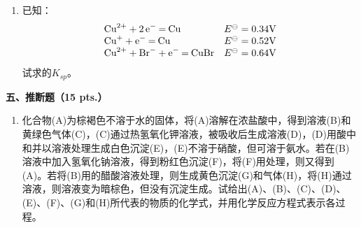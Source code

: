 \begin{enumerate}[label=\arabic*., start=1, itemsep=1.5ex]
    已知相关电对的电极电势值为：$E^\ominus(\ce{MnO(OH)2/Mn(OH)2}) = -0.05\mathrm{V}$；$E^\ominus(\ce{MnO2/Mn^{2+}}) = 1.23\mathrm{V}$；$E^\ominus(\ce{O2/OH^-}) = 0.401\mathrm{V}$；$E^\ominus(\ce{I2/I^-}) = 0.536\mathrm{V}$；$E^\ominus(\ce{S4O6^{2-}/S2O3^{2-}}) = 0.08\mathrm{V}$。
    \item 已知：
    \[
    \begin{array}{ll}
    \ce{Cu^{2+} + 2e^- = Cu} & E^\ominus = 0.34\mathrm{V} \\
    \ce{Cu^+ + e^- = Cu} & E^\ominus = 0.52\mathrm{V} \\
    \ce{Cu^{2+} + Br^- + e^- = CuBr} & E^\ominus = 0.64\mathrm{V}
    \end{array}
    \]
    试求的$K_{sp}$。
\end{enumerate}

\vspace{0.5cm}
\noindent\textbf{五、推断题（15 pts.）}

\begin{enumerate}[label=\arabic*., start=1, itemsep=1.5ex]
    \item 化合物(A)为棕褐色不溶于水的固体，将(A)溶解在浓盐酸中，得到溶液(B)和黄绿色气体(C)，(C)通过热氢氧化钾溶液，被吸收后生成溶液(D)，(D)用酸中和并以溶液处理生成白色沉淀(E)，(E)不溶于硝酸，但可溶于氨水。若在(B)溶液中加入氢氧化钠溶液，得到粉红色沉淀(F)，将(F)用处理，则又得到(A)。若将(B)用的醋酸溶液处理，则生成黄色沉淀(G)和气体(H)，将(H)通过溶液，则溶液变为暗棕色，但没有沉淀生成。试给出(A)、(B)、(C)、(D)、(E)、(F)、(G)和(H)所代表的物质的化学式，并用化学反应方程式表示各过程。
\end{enumerate}